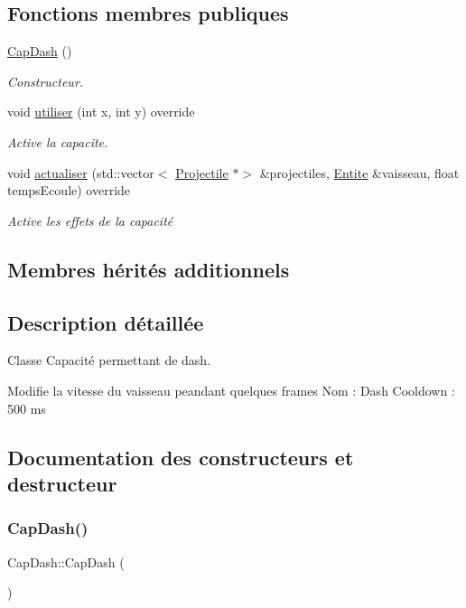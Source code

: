 \subsection*{Fonctions membres publiques}
\begin{DoxyCompactItemize}
\item 
\hyperlink{class_cap_dash_ac38287e31284b6b5ac8add730830bfed}{Cap\+Dash} ()
\begin{DoxyCompactList}\small\item\em Constructeur. \end{DoxyCompactList}\item 
void \hyperlink{class_cap_dash_a8a0fe26c8b13d8a9f6cf5a95d6559f3d}{utiliser} (int x, int y) override
\begin{DoxyCompactList}\small\item\em Active la capacite. \end{DoxyCompactList}\item 
void \hyperlink{class_cap_dash_a23e3009b85288e7aadce2eb2b581fac0}{actualiser} (std\+::vector$<$ \hyperlink{class_projectile}{Projectile} $\ast$$>$ \&projectiles, \hyperlink{class_entite}{Entite} \&vaisseau, float temps\+Ecoule) override
\begin{DoxyCompactList}\small\item\em Active les effets de la capacité \end{DoxyCompactList}\end{DoxyCompactItemize}
\subsection*{Membres hérités additionnels}


\subsection{Description détaillée}
Classe Capacité permettant de dash. 

Modifie la vitesse du vaisseau peandant quelques frames Nom \+: Dash Cooldown \+: 500 ms 

\subsection{Documentation des constructeurs et destructeur}
\mbox{\label{class_cap_dash_ac38287e31284b6b5ac8add730830bfed}} 
\subsubsection{\texorpdfstring{Cap\+Dash()}{CapDash()}}
{\footnotesize\ttfamily Cap\+Dash\+::\+Cap\+Dash (\begin{DoxyParamCaption}{ }\end{DoxyParamCaption})}



